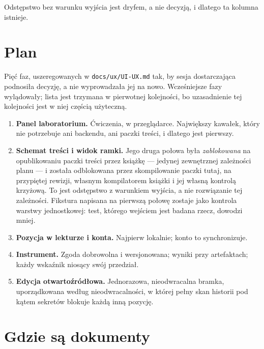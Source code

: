 \documentclass[11pt,a4paper]{article}
\begin{document}
Odstępstwo bez warunku wyjścia jest dryfem, a nie decyzją, i dlatego ta kolumna istnieje.

\section{Plan}

Pięć faz, uszeregowanych w \texttt{docs/ux/UI-UX.md} tak, by sesja dostarczająca podnosiła
decyzję, a nie wyprowadzała jej na nowo. Wcześniejsze fazy wylądowały; lista jest trzymana w
pierwotnej kolejności, bo uzasadnienie tej kolejności jest w niej częścią użyteczną.

\begin{enumerate}[leftmargin=2em,itemsep=2pt]
  \item \textbf{Panel laboratorium.} Ćwiczenia, w przeglądarce. Największy kawałek, który nie
        potrzebuje ani backendu, ani paczki treści, i dlatego jest pierwszy.
  \item \textbf{Schemat treści i widok ramki.} Jego druga połowa była \emph{zablokowana} na
        opublikowaniu paczki treści przez książkę --- jedynej zewnętrznej zależności planu ---
        i została odblokowana przez skompilowanie paczki tutaj, na przypiętej rewizji, własnym
        kompilatorem książki i jej własną kontrolą krzyżową. To jest odstępstwo z warunkiem
        wyjścia, a nie rozwiązanie tej zależności. Fikstura napisana na pierwszą połowę
        zostaje jako kontrola warstwy jednostkowej: test, którego wejściem jest badana rzecz,
        dowodzi mniej.
  \item \textbf{Pozycja w lekturze i konta.} Najpierw lokalnie; konto to synchronizuje.
  \item \textbf{Instrument.} Zgoda dobrowolna i wersjonowana; wyniki przy artefaktach; każdy
        wskaźnik niosący swój przedział.
  \item \textbf{Edycja otwartoźródłowa.} Jednorazowa, nieodwracalna bramka, uporządkowana
        według nieodwracalności, w której pełny skan historii pod kątem sekretów blokuje każdą
        inną pozycję.
\end{enumerate}

\section{Gdzie są dokumenty}
\end{document}
